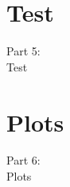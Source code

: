 \section{Test}
\begin{frame}
    \vspace{25mm}
    \begin{center}
        \Huge{Part 5:\\Test}
    \end{center}
\end{frame}

\section{Plots}
\begin{frame}
    \vspace{25mm}
    \begin{center}
        \Huge{Part 6:\\Plots}
    \end{center}
\end{frame}

